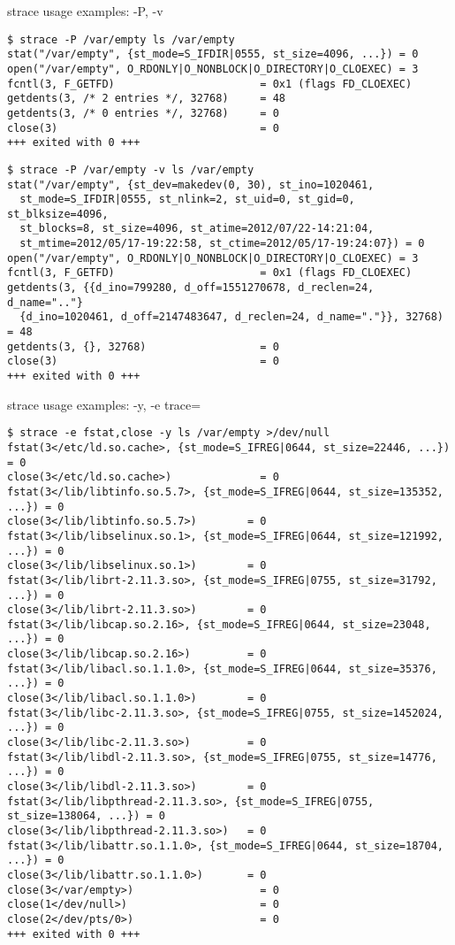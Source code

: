 \documentclass[unicode]{beamer}
\begin{document}
\begin{frame}[fragile]{strace usage examples: -P, -v}
\scriptsize
\begin{verbatim}
$ strace -P /var/empty ls /var/empty
stat("/var/empty", {st_mode=S_IFDIR|0555, st_size=4096, ...}) = 0
open("/var/empty", O_RDONLY|O_NONBLOCK|O_DIRECTORY|O_CLOEXEC) = 3
fcntl(3, F_GETFD)                       = 0x1 (flags FD_CLOEXEC)
getdents(3, /* 2 entries */, 32768)     = 48
getdents(3, /* 0 entries */, 32768)     = 0
close(3)                                = 0
+++ exited with 0 +++
\end{verbatim}

\begin{verbatim}
$ strace -P /var/empty -v ls /var/empty
stat("/var/empty", {st_dev=makedev(0, 30), st_ino=1020461,
  st_mode=S_IFDIR|0555, st_nlink=2, st_uid=0, st_gid=0, st_blksize=4096,
  st_blocks=8, st_size=4096, st_atime=2012/07/22-14:21:04,
  st_mtime=2012/05/17-19:22:58, st_ctime=2012/05/17-19:24:07}) = 0
open("/var/empty", O_RDONLY|O_NONBLOCK|O_DIRECTORY|O_CLOEXEC) = 3
fcntl(3, F_GETFD)                       = 0x1 (flags FD_CLOEXEC)
getdents(3, {{d_ino=799280, d_off=1551270678, d_reclen=24, d_name=".."}
  {d_ino=1020461, d_off=2147483647, d_reclen=24, d_name="."}}, 32768) = 48
getdents(3, {}, 32768)                  = 0
close(3)                                = 0
+++ exited with 0 +++
\end{verbatim}
\end{frame}

\begin{frame}[fragile]{strace usage examples: -y, -e trace=}
\scriptsize
\begin{verbatim}
$ strace -e fstat,close -y ls /var/empty >/dev/null
fstat(3</etc/ld.so.cache>, {st_mode=S_IFREG|0644, st_size=22446, ...}) = 0
close(3</etc/ld.so.cache>)              = 0
fstat(3</lib/libtinfo.so.5.7>, {st_mode=S_IFREG|0644, st_size=135352, ...}) = 0
close(3</lib/libtinfo.so.5.7>)        = 0
fstat(3</lib/libselinux.so.1>, {st_mode=S_IFREG|0644, st_size=121992, ...}) = 0
close(3</lib/libselinux.so.1>)        = 0
fstat(3</lib/librt-2.11.3.so>, {st_mode=S_IFREG|0755, st_size=31792, ...}) = 0
close(3</lib/librt-2.11.3.so>)        = 0
fstat(3</lib/libcap.so.2.16>, {st_mode=S_IFREG|0644, st_size=23048, ...}) = 0
close(3</lib/libcap.so.2.16>)         = 0
fstat(3</lib/libacl.so.1.1.0>, {st_mode=S_IFREG|0644, st_size=35376, ...}) = 0
close(3</lib/libacl.so.1.1.0>)        = 0
fstat(3</lib/libc-2.11.3.so>, {st_mode=S_IFREG|0755, st_size=1452024, ...}) = 0
close(3</lib/libc-2.11.3.so>)         = 0
fstat(3</lib/libdl-2.11.3.so>, {st_mode=S_IFREG|0755, st_size=14776, ...}) = 0
close(3</lib/libdl-2.11.3.so>)        = 0
fstat(3</lib/libpthread-2.11.3.so>, {st_mode=S_IFREG|0755, st_size=138064, ...}) = 0
close(3</lib/libpthread-2.11.3.so>)   = 0
fstat(3</lib/libattr.so.1.1.0>, {st_mode=S_IFREG|0644, st_size=18704, ...}) = 0
close(3</lib/libattr.so.1.1.0>)       = 0
close(3</var/empty>)                    = 0
close(1</dev/null>)                     = 0
close(2</dev/pts/0>)                    = 0
+++ exited with 0 +++
\end{verbatim}
\end{frame}
\end{document}
